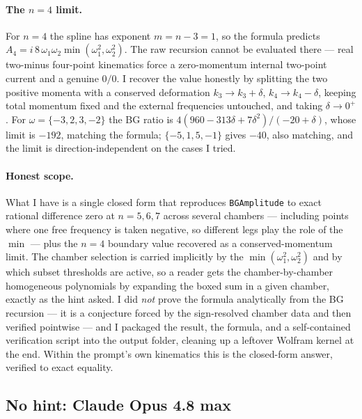 \documentclass{article}
\begin{document}
\paragraph{The $n=4$ limit.}
For $n=4$ the spline has exponent $m=n-3=1$, so the formula predicts
$A_4=i\,8\,\omega_1\omega_2\min(\omega_1^2,\omega_2^2)$. The raw recursion cannot
be evaluated there --- real two-minus four-point kinematics force a zero-momentum
internal two-point current and a genuine $0/0$. I recover the value honestly by
splitting the two positive momenta with a conserved deformation
$k_3\to k_3+\delta$, $k_4\to k_4-\delta$, keeping total momentum fixed and the
external frequencies untouched, and taking $\delta\to0^+$. For
$\omega=\{-3,2,3,-2\}$ the BG ratio is $4(960-313\delta+7\delta^2)/(-20+\delta)$,
whose limit is $-192$, matching the formula; $\{-5,1,5,-1\}$ gives $-40$, also
matching, and the limit is direction-independent on the cases I tried.

\paragraph{Honest scope.}
What I have is a single closed form that reproduces \texttt{BGAmplitude} to exact
rational difference zero at $n=5,6,7$ across several chambers --- including points
where one free frequency is taken negative, so different legs play the role of the
$\min$ --- plus the $n=4$ boundary value recovered as a conserved-momentum limit.
The chamber selection is carried implicitly by the $\min(\omega_1^2,\omega_2^2)$
and by which subset thresholds are active, so a reader gets the chamber-by-chamber
homogeneous polynomials by expanding the boxed sum in a given chamber, exactly as
the hint asked. I did \emph{not} prove the formula analytically from the BG
recursion --- it is a conjecture forced by the sign-resolved chamber data and
then verified pointwise --- and I packaged the result, the formula, and a
self-contained verification script into the output folder, cleaning up a leftover
Wolfram kernel at the end. Within the prompt's own kinematics this is the
closed-form answer, verified to exact equality.

\clearpage
\subsection{No hint: Claude Opus 4.8 max}
\label{app:log:case3:claude-max}
\end{document}
